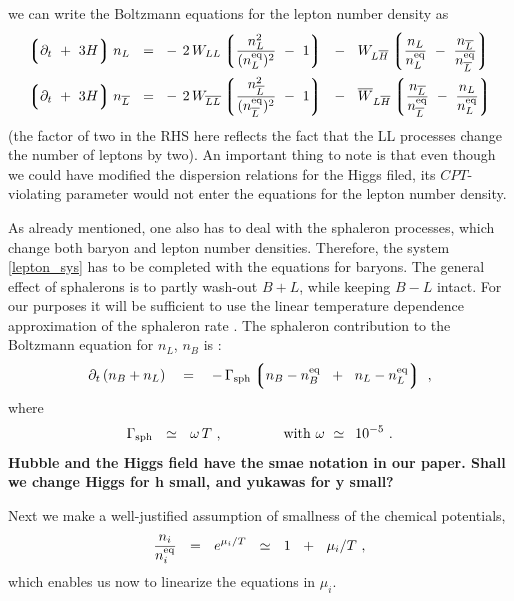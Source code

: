 \documentclass[12pt]{revtex4}
\newcommand{\eq}{{\rm eq}}
\newcommand{\lgr}{\left\lgroup}
\newcommand{\rgr}{\right\rgroup}
\newcommand{\Gsph}{\Gamma_{\rm sph}}
\newcommand{\p}{\partial}
\newcommand{\ov}{\overline}
\begin{document}
we can write the Boltzmann equations for the lepton number density
	as
\begin{equation}
\label{lepton_sys}
\begin{split}
	\lgr \p_t ~+~ 3H \rgr 
		n_L ~~=~~ &
	-\, 2\, W_{LL} \lgr \frac{n_L^2}{(n_L^\eq)^2} ~-~ 1 \rgr
	~~-~~
	W_{L\ov{H}} \lgr \frac{n_L}{n_L^\eq} ~-~ 
			\frac{n_{\ov{L}}}{n_{\ov{L}}^\eq} \rgr  \\
	\lgr \p_t ~+~ 3H \rgr 
		n_{\ov{L}} ~~=~~ &
	-\, 2\, W_{\ov{LL}} \lgr 
		\frac{n_{\ov{L}}^2}{(n_{\ov{L}}^\eq)^2} ~-~ 1 \rgr
	~~-~~
	\ov{W}_{L\ov{H}} \lgr \frac{n_{\ov{L}}}{n_{\ov{L}}^\eq} ~-~ 
			\frac{n_L}{n_L^\eq} \rgr  \\
\end{split}
\end{equation}
	(the factor of two in the RHS here reflects the fact 
	that the LL processes change the number of leptons by two).
	An important thing to note is that even though we could have 
	modified the dispersion relations for the Higgs filed, 
	its $CPT$-violating parameter would not enter the equations for the lepton number
	density.

	As already mentioned,
	one also has to deal with the sphaleron processes, which change
	both baryon and lepton number densities.
	Therefore, the system \eqref{lepton_sys} has to be completed with
	the equations for baryons.
	The general effect of sphalerons is to partly wash-out $ B + L $,
	while keeping $ B - L $ intact.
	For our purposes it will be sufficient to use the linear
	temperature dependence approximation of the sphaleron rate
\cite{Kuzmin:1985mm,Khlebnikov:1988sr}. 
	The sphaleron contribution to the Boltzmann equation
	for $ n_L $, $ n_B $ is 
\cite{Kuzmin:1985mm,Moore:2000mx,Moore:2000ar}:
\begin{equation}
\label{sph_corr}
	\p_t\, (n_B + n_L)
	~~~=~~~ -\, \Gsph 
		\lgr   n_B - n_B^\eq \;~+~\;
		       n_L - n_L^\eq 
		\rgr~,
\end{equation}
	where
\[
	\Gsph ~~\simeq~~ \omega\, T~, \qquad\qquad 
	{\rm ~with~}
	\omega ~\simeq~ \,10^{-5}~.
\]
	{\bf Hubble and the Higgs field have the smae notation in our paper. 
	Shall we change Higgs for h small, and yukawas for y small?} 
	
	Next we make a well-justified assumption of 
	smallness of the chemical potentials,
\[
	\frac{n_i}{n_i^\eq} ~~=~~ e^{\mu_i/T} ~~\simeq~~ 1 ~~+~~ \mu_i/T~,
\]
	which enables us now to linearize the equations in $ \mu_i $.
\end{document}
